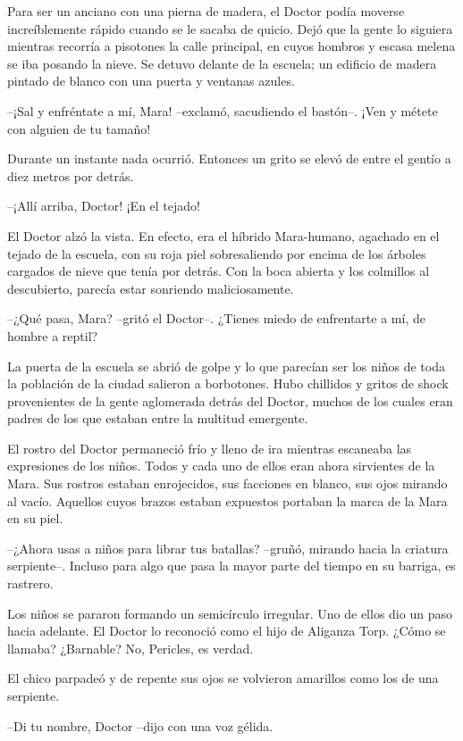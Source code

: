 Para ser un anciano con una pierna de madera, el Doctor podía moverse increíblemente rápido cuando se le sacaba de quicio. Dejó que la gente lo siguiera mientras recorría a pisotones la calle principal, en cuyos hombros y escasa melena se iba posando la nieve. Se detuvo delante de la escuela; un edificio de madera pintado de blanco con una puerta y ventanas azules.

--¡Sal y enfréntate a mí, Mara! --exclamó, sacudiendo el bastón--. ¡Ven y métete con alguien de tu tamaño!

Durante un instante nada ocurrió. Entonces un grito se elevó de entre el gentío a diez metros por detrás.

--¡Allí arriba, Doctor! ¡En el tejado!

El Doctor alzó la vista. En efecto, era el híbrido Mara-humano, agachado en el tejado de la escuela, con su roja piel sobresaliendo por encima de los árboles cargados de nieve que tenía por detrás. Con la boca abierta y los colmillos al descubierto, parecía estar sonriendo maliciosamente.

--¿Qué pasa, Mara? --gritó el Doctor--. ¿Tienes miedo de enfrentarte a mí, de hombre a reptil?

La puerta de la escuela se abrió de golpe y lo que parecían ser los niños de toda la población de la ciudad salieron a borbotones. Hubo chillidos y gritos de shock provenientes de la gente aglomerada detrás del Doctor, muchos de los cuales eran padres de los que estaban entre la multitud emergente.

El rostro del Doctor permaneció frío y lleno de ira mientras escaneaba las expresiones de los niños. Todos y cada uno de ellos eran ahora sirvientes de la Mara. Sus rostros estaban enrojecidos, sus facciones en blanco, sus ojos mirando al vacío. Aquellos cuyos brazos estaban expuestos portaban la marca de la Mara en su piel.

--¿Ahora usas a niños para librar tus batallas? --gruñó, mirando hacia la criatura serpiente--. Incluso para algo que pasa la mayor parte del tiempo en su barriga, es rastrero.

Los niños se pararon formando un semicírculo irregular. Uno de ellos dio un paso hacia adelante. El Doctor lo reconoció como el hijo de Aliganza Torp. ¿Cómo se llamaba? ¿Barnable? No, Pericles, es verdad.

El chico parpadeó y de repente sus ojos se volvieron amarillos como los de una serpiente.

--Di tu nombre, Doctor --dijo con una voz gélida.

